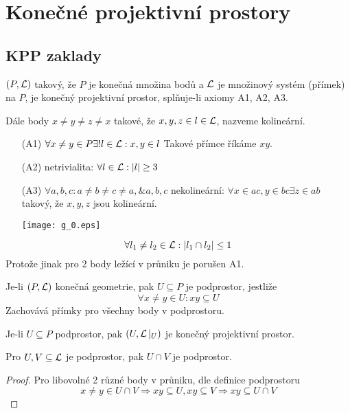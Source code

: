 \section{\texorpdfstring{Konečné projektivní prostory}{Konečné projektivní prostory}}

\subsection{KPP zaklady}

\begin{definition}\label{kpp:kpp}
    $(P,\operatorname{\mathcal{L}})$ takový, že $P$ je konečná množina bodů a $\operatorname{\mathcal{L}}$ je množinový systém (přímek) na $P$, je konečný projektivní prostor, splňuje-li axiomy A1, A2, A3.

    Dále body $x\neq y\neq z\neq x$ takové, že $x,y,z\in l\in\operatorname{\mathcal{L}}$, nazveme kolineární.

    \begin{itemize}
        \item[(A1)] $\forall x\neq y\in P\exists! l\in \operatorname{\mathcal{L}}: x,y\in l$
		Takové přímce říkáme $xy$.
        \item[(A2)] netrivialita: $\forall l \in \operatorname{\mathcal{L}}: |l| \geq 3$
	\item[(A3)]  $\forall a,b,c: a\neq b\neq c\neq a, \& a,b,c$ nekolineární: $\forall x\in ac, y\in bc\exists z\in ab$ takový, že $x,y,z$ jsou kolineární.

	\texttt{[image: g\_0.eps]}
    \end{itemize}
\end{definition}

\begin{observation}
	\[ \forall l_1 \ne l_2 \in \operatorname{\mathcal{L}} : |l_1 \cap l_2| \leq 1\]
	Protože jinak pro 2 body ležící v průniku je porušen A1.
\end{observation}

\begin{definition}[Podprostor]\label{kpp:subspace}
    Je-li $(P, \operatorname{\mathcal{L}})$ konečná geometrie, pak $U \subseteq P$ je podprostor, jestliže
    \[ \forall x\neq y\in U: xy\subseteq U \]
    Zachovává přímky pro všechny body v podprostoru.
\end{definition}

\begin{note}
    Je-li $U\subseteq P$ podprostor, pak $(U,\operatorname{\mathcal{L}}|_U)$ je konečný projektivní prostor.
\end{note}

\begin{lemma}
    Pro $U,V\subseteq \operatorname{\mathcal{L}}$ je podprostor, pak $U\cap V$ je podprostor.
\end{lemma}
\begin{proof}
	Pro libovolné 2 různé body v průniku, dle definice podprostoru
	\[ x \ne y \in U \cap V \Rightarrow xy \subseteq U, xy \subseteq V \Rightarrow xy \subseteq U \cap V \]
\end{proof}

